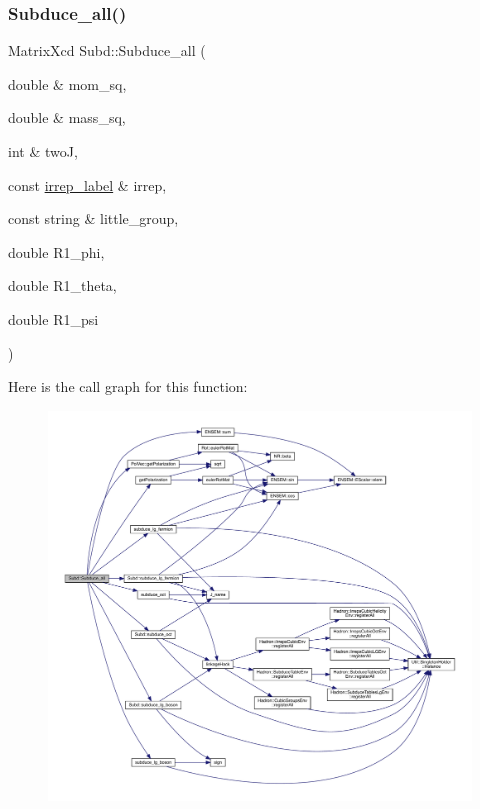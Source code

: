 \subsubsection{\texorpdfstring{Subduce\_all()}{Subduce\_all()}}
{\footnotesize\ttfamily Matrix\+Xcd Subd\+::\+Subduce\+\_\+all (\begin{DoxyParamCaption}\item[{double \&}]{mom\+\_\+sq,  }\item[{double \&}]{mass\+\_\+sq,  }\item[{int \&}]{twoJ,  }\item[{const \mbox{\hyperlink{structirrep__label}{irrep\+\_\+label}} \&}]{irrep,  }\item[{const string \&}]{little\+\_\+group,  }\item[{double}]{R1\+\_\+phi,  }\item[{double}]{R1\+\_\+theta,  }\item[{double}]{R1\+\_\+psi }\end{DoxyParamCaption})}

Here is the call graph for this function\+:
\nopagebreak
\begin{figure}[H]
\begin{center}
\leavevmode
\includegraphics[width=350pt]{d8/d2b/namespaceSubd_ae0133abbe7b9e31a6eafd50c5a2320e3_cgraph}
\end{center}
\end{figure}
\mbox{\label{namespaceSubd_a5f31b3ef70ad25320a8010ec3017eb04}} 
